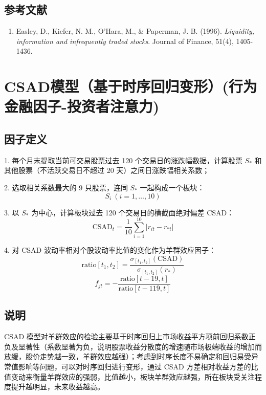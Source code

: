 \documentclass{article}
\begin{document}
\subsection{参考文献}
\begin{enumerate}
    \item Easley, D., Kiefer, N. M., O'Hara, M., \& Paperman, J. B. (1996). \textit{Liquidity, information and infrequently traded stocks}. Journal of Finance, 51(4), 1405-1436.
\end{enumerate}

\section{CSAD模型（基于时序回归变形）(行为金融因子-投资者注意力)}

\subsection{因子定义}

1. 每个月末提取当前可交易股票过去 120 个交易日的涨跌幅数据，计算股票 \( S_* \) 和其他股票（不活跃交易日不超过 20 天）之间日涨跌幅相关系数；

2. 选取相关系数最大的 9 只股票，连同 \( S_* \) 一起构成一个板块：
   \begin{equation}
       S_i \ (i = 1, \dots, 10)
   \end{equation}

3. 以 \( S_* \) 为中心，计算板块过去 120 个交易日的横截面绝对偏差 \( \mathrm{CSAD} \)：
   \begin{equation}
       \mathrm{CSAD}_t = \frac{1}{10} \sum_{i=1}^{10} |r_{it} - r_{*t}|
   \end{equation}

4. 对 CSAD 波动率相对个股波动率比值的变化作为羊群效应因子：
   \begin{equation}
       \mathrm{ratio}[t_1, t_2] = \frac{\sigma_{[t_1, t_2]}(\mathrm{CSAD})}{\sigma_{[t_1, t_2]}(r_*)}
   \end{equation}
   \begin{equation}
       f_{jt} = -\frac{\mathrm{ratio}[t-19, t]}{\mathrm{ratio}[t-119, t]}
   \end{equation}

\subsection{说明}
CSAD 模型对羊群效应的检验主要基于时序回归上市场收益平方项前回归系数正负及显著性（系数显著为负，说明股票收益分散度的增速随市场极端收益的增加而放缓，股价走势越一致，羊群效应越强）；考虑到时序长度不易确定和回归易受异常值影响等问题，可以对时序回归进行变形，通过 CSAD 方差相对收益方差的比值变动来衡量羊群效应的强弱，比值越小，板块羊群效应越强，所在板块受关注程度提升越明显，未来收益越高。
\end{document}
